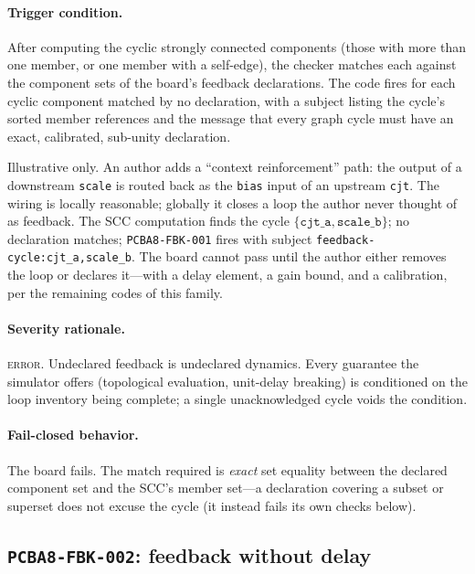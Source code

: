 \paragraph{Trigger condition.} After computing the cyclic strongly connected components (those with more than one member, or one member with a self-edge), the checker matches each against the component sets of the board's feedback declarations. The code fires for each cyclic component matched by no declaration, with a subject listing the cycle's sorted member references and the message that every graph cycle must have an exact, calibrated, sub-unity declaration.

\begin{example}\label{ch07:ex:fbk001}
Illustrative only. An author adds a ``context reinforcement'' path: the output of a downstream \texttt{scale} is routed back as the \texttt{bias} input of an upstream \texttt{cjt}. The wiring is locally reasonable; globally it closes a loop the author never thought of as feedback. The SCC computation finds the cycle $\{\texttt{cjt\_a}, \texttt{scale\_b}\}$; no declaration matches; \texttt{PCBA8-FBK-001} fires with subject \texttt{feedback-cycle:cjt\_a,scale\_b}. The board cannot pass until the author either removes the loop or declares it---with a delay element, a gain bound, and a calibration, per the remaining codes of this family.
\end{example}

\paragraph{Severity rationale.} \textsc{error}. Undeclared feedback is undeclared dynamics. Every guarantee the simulator offers (topological evaluation, unit-delay breaking) is conditioned on the loop inventory being complete; a single unacknowledged cycle voids the condition.

\paragraph{Fail-closed behavior.} The board fails. The match required is \emph{exact} set equality between the declared component set and the SCC's member set---a declaration covering a subset or superset does not excuse the cycle (it instead fails its own checks below).

\subsection{\texttt{PCBA8-FBK-002}: feedback without delay}\label{ch07:sub:fbk002}

